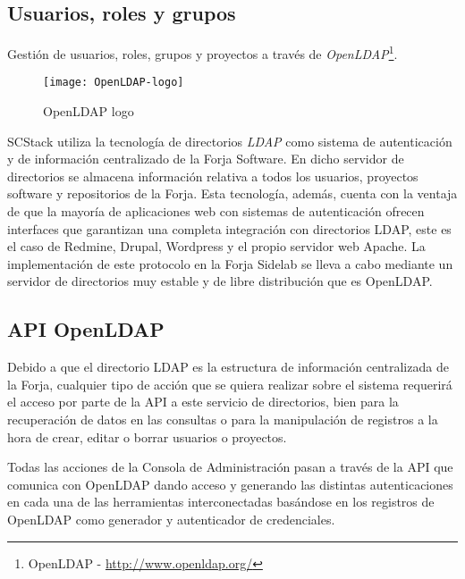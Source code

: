 \subsection{Usuarios, roles y grupos}
\label{sub:usuarios-roles-grupos}

\par Gestión de usuarios, roles, grupos y proyectos a través de \emph{OpenLDAP}\footnote{OpenLDAP - \url{http://www.openldap.org/}}.

\begin{figure}[H]
    \centering
    \texttt{[image: OpenLDAP-logo]}
    \caption{OpenLDAP logo}
    \label{fig:openldap-logo}
\end{figure}

\par SCStack utiliza la tecnología de directorios \emph{LDAP} como sistema de autenticación y de información centralizado de la Forja Software. En dicho servidor de directorios se almacena información relativa a todos los usuarios, proyectos software y repositorios de la Forja. Esta tecnología, además, cuenta con la ventaja de que la mayoría de aplicaciones web con sistemas de autenticación ofrecen interfaces que garantizan una completa integración con directorios LDAP, este es el caso de Redmine, Drupal, Wordpress y el propio servidor web Apache. La implementación de este protocolo en la Forja Sidelab se lleva a cabo mediante un servidor de directorios muy estable y de libre distribución que es OpenLDAP.

\subsection{API OpenLDAP}
\label{sub:api-openldap}

\par Debido a que el directorio LDAP es la estructura de información centralizada de la Forja, cualquier tipo de acción que se quiera realizar sobre el sistema requerirá el acceso por parte de la API a este servicio de directorios, bien para la recuperación de datos en las consultas o para la manipulación de registros a la hora de crear, editar o borrar usuarios o proyectos.

\par Todas las acciones de la Consola de Administración pasan a través de la API que comunica con OpenLDAP dando acceso y generando las distintas autenticaciones en cada una de las herramientas interconectadas basándose en los registros de OpenLDAP como generador y autenticador de credenciales.

